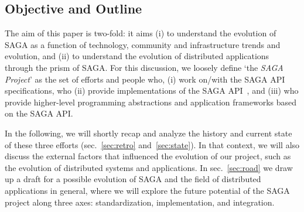 \documentclass[]{article}
\newcommand{\I}[1]{\textit{#1}}
\begin{document}
\subsection{Objective and Outline} 
The aim of this paper is two-fold: it aims (i) to understand the
evolution of SAGA as a function of technology, community and
infrastructure trends and evolution, and (ii) to understand the
evolution of distributed applications through the prism of SAGA.  For
this discussion, we loosely define `the \I{SAGA Project}' as the set
of efforts and people who, (i) work on/with the SAGA API
specifications\cite{ogf-gfd-90}, who (ii) provide implementations of
the SAGA API~\cite{Kaiser:2006qp,jsaga,javasaga}, and (iii) who
provide higher-level programming abstractions and application
frameworks based on the SAGA
API\cite{bigjob_cloudcom10,fresh-dag-escience,Sehgal2011590}.

In the following, we will shortly recap and analyze the history and
current state of these three efforts (sec.~\ref{sec:retro}
and~\ref{sec:state}). In that context, we will also discuss the
external factors that influenced the evolution of our project, such as
the evolution of distributed systems and applications.  In
sec.~\ref{sec:road} we draw up a draft for a possible evolution of
SAGA and the field of distributed applications in general, where we
will explore the future potential of the SAGA project along three
axes: standardization, implementation, and integration.
 

 
\end{document}
